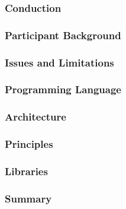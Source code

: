 \subsubsection{Conduction}
\subsubsection{Participant Background}
\subsubsection{Issues and Limitations}
\subsubsection{Programming Language}
\subsubsection{Architecture}
\subsubsection{Principles}
\subsubsection{Libraries}
\subsubsection{Summary}
